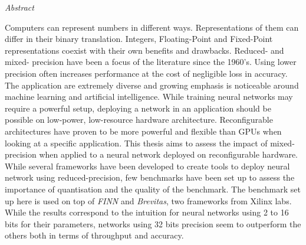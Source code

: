 \documentclass[11pt, oneside]{Thesis} %
\begin{document}
\clearpage %




 {\huge{\textit{Abstract}} \par}{

Computers can represent numbers in different ways. Representations of them can differ in their binary translation. Integers, Floating-Point and Fixed-Point representations coexist with their own benefits and drawbacks. Reduced- and mixed- precision have been a focus of the literature since the 1960's. Using lower precision often increases performance at the cost of negligible loss in accuracy. The application are extremely diverse and growing emphasis is noticeable around machine learning and artificial intelligence. While training neural networks may require a powerful setup, deploying a network in an application should be possible on low-power, low-resource hardware architecture. Reconfigurable architectures have proven to be more powerful and flexible than GPUs when looking at a specific application. This thesis aims to assess the impact of mixed-precision when applied to a neural network deployed on reconfigurable hardware. While several frameworks have been developed to create tools to deploy neural network using reduced-precision, few benchmarks have been set up to assess the importance of quantisation and the quality of the benchmark. The benchmark set up here is used on top of \emph{FINN} and \emph{Brevitas}, two frameworks from Xilinx labs. While the results correspond to the intuition for neural networks using 2 to 16 bits for their parameters, networks using 32 bits precision seem to outperform the others both in terms of throughput and accuracy.
%


\clearpage %


}
\end{document}
